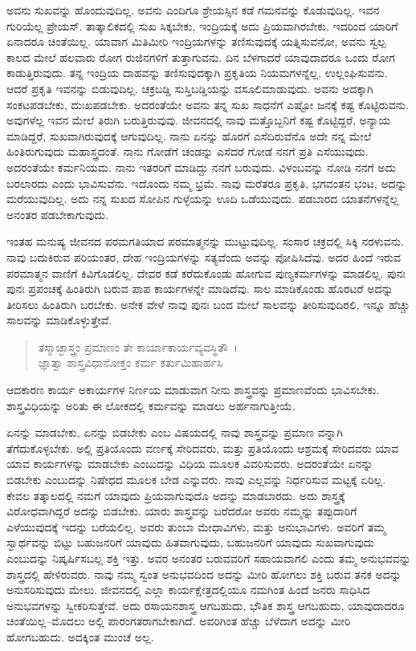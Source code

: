 ಅವನು ಸುಖವನ್ನು ಹೊಂದುವುದಿಲ್ಲ. ಅವನು ಎಂದಿಗೂ ಶ್ರೇಯಸ್ಸಿನ ಕಡೆ ಗಮನವನ್ನು ಕೊಡುವುದಿಲ್ಲ. ಇವನ ಗುರಿಯೆಲ್ಲ ಪ್ರೇಯಸ್. ತಾತ್ಕಾಲಿಕದಲ್ಲಿ ಸುಖ ಸಿಕ್ಕಬೇಕು, ಇಂದ್ರಿಯಕ್ಕೆ ಅದು ಪ್ರಿಯವಾಗಿರಬೇಕು. ಇದರಿಂದ ಯಾರಿಗೆ ಏನಾದರೂ ಚಿಂತೆಯಿಲ್ಲ. ಯಾವಾಗ ಮಿತಿಮೀರಿ ಇಂದ್ರಿಯಗಳನ್ನು ತಣಿಸುವುದಕ್ಕೆ ಯತ್ನಿಸುವನೋ, ಅವನು ಸ್ವಲ್ಪ ಕಾಲದ ಮೇಲೆ ಹಲವಾರು ರೋಗ ರುಜಿನಗಳಿಗೆ ತುತ್ತಾಗುವನು. ದಿನ ಬೆಳಗಾದರೆ ಯಾವುದಾದರೂ ಒಂದು ರೋಗ ಕಾಡುತ್ತಿರುವುದು. ತನ್ನ ಇಂದ್ರಿಯ ದಾಹವನ್ನು ತಣಿಸುವುದಕ್ಕಾಗಿ ಪ್ರಕೃತಿಯ ನಿಯಮಗಳನ್ನೆಲ್ಲ, ಉಲ್ಲಂಘಿಸುವನು. ಆದರೆ ಪ್ರಕೃತಿ ಇವನನ್ನು ಬಿಡುವುದಿಲ್ಲ. ಚಕ್ರಬಡ್ಡಿ ಸುಸ್ತಿಬಡ್ಡಿಯನ್ನು ವಸೂಲಿಮಾಡುವುದು. ಅವನು ಅದಕ್ಕಾಗಿ ಸಂಕಟಪಡಬೇಕು, ದುಃಖಪಡಬೇಕು. ಅದರಂತೆಯೇ ಅವನು ತನ್ನ ಸುಖ ಸಾಧನೆಗೆ ಎಷ್ಟೋ ಜನಕ್ಕೆ ಕಷ್ಟ ಕೊಟ್ಟಿರುವನು. ಅವುಗಳೆಲ್ಲ ಇವನ ಮೇಲೆ ತಿರುಗಿ ಬರುತ್ತಿರುವುವು. ಜೀವನದಲ್ಲಿ ನಾವು ಮತ್ತೊಬ್ಬನಿಗೆ ಕಷ್ಟ ಕೊಟ್ಟಿದ್ದರೆ, ಅನ್ಯಾಯ ಮಾಡಿದ್ದರೆ, ಸುಖವಾಗಿರುವುದಕ್ಕೆ ಆಗುವುದಿಲ್ಲ. ನಾನು ಏನನ್ನು ಹೊರಗೆ ಎಸೆದಿರುವೆನೊ ಅದೇ ನನ್ನ ಮೇಲೆ ಹಿಂತಿರುಗುವುದು ಮಹಾಸ್ತ್ರದಂತೆ. ನಾನು ಗೋಡೆಗೆ ಚಂಡನ್ನು ಎಸೆದರೆ ಗೋಡೆ ನನಗೆ ಪ್ರತಿ ಎಸೆಯುವುದು. ಅದರಂತೆಯೇ ಕರ್ಮನಿಯಮ. ನಾನು ಇತರರಿಗೆ ಮಾಡಿದ್ದು ನನಗೆ ಬರುವುದು. ವಿಳಂಬವನ್ನು ನೋಡಿ ನನಗೆ ಅದು ಬರಲಾರದು ಎಂದು ಭಾವಿಸುವೆನು. ಇದೊಂದು ನಮ್ಮ ಭ್ರಮೆ. ನಾವು ಮರೆತರೂ ಪ್ರಕೃತಿ, ಭಗವಂತನ ಭಂಟ, ಅದನ್ನು ಮರೆಯುವುದಿಲ್ಲ. ಅದು ನನ್ನ ಸುಖದ ಸೋಪಿನ ಗುಳ್ಳೆಯನ್ನು ಊದಿ ಒಡೆಯುವುದು. ಪಡಬಾರದ ಯಾತನೆಗಳನ್ನೆಲ್ಲ ಅನಂತರ ಪಡಬೇಕಾಗುವುದು.

ಇಂತಹ ಮನುಷ್ಯ ಜೀವನದ ಪರಮಗತಿಯಾದ ಪರಮಾತ್ಮನನ್ನು ಮುಟ್ಟುವುದಿಲ್ಲ. ಸಂಸಾರ ಚಕ್ರದಲ್ಲಿ ಸಿಕ್ಕಿ ನರಳುವನು. ನಾವು ಬದುಕಿರುವ ಪರಿಯಂತರ, ದೇಹ ಇಂದ್ರಿಯಗಳನ್ನು ಸತ್ಯವೆಂದು ಅವನ್ನು ಪೋಷಿಸಿದೆವು. ಅದರ ಹಿಂದೆ ಇರುವ ಪರಮಾತ್ಮನ ವಾಣಿಗೆ ಕಿವಿಗೊಡಲಿಲ್ಲ. ದೇವರ ಕಡೆ ಕರೆದುಕೊಂಡು ಹೋಗುವ ಪುಣ್ಯಕರ್ಮಗಳನ್ನು ಮಾಡಲಿಲ್ಲ. ಪುನಃ ಪುನಃ ಪ್ರಪಂಚಕ್ಕೆ ಹಿಂತಿರುಗಿ ಬರುವ ಪಾಪ ಕಾರ್ಯಗಳನ್ನೇ ಮಾಡಿದೆವು. ಸಾಲ ಮಾಡಿಕೊಂಡು ಹೊರಟರೆ ಅದನ್ನು ತೀರಿಸಲು ಹಿಂತಿರುಗಿ ಬರಬೇಕು. ಅನೇಕ ವೇಳೆ ನಾವು ಪುನಃ ಬಂದ ಮೇಲೆ ಸಾಲವನ್ನು ತೀರಿಸುವುದಿರಲಿ, ಇನ್ನೂ ಹೆಚ್ಚು ಸಾಲವನ್ನು ಮಾಡಿಕೊಳ್ಳುತ್ತೇವೆ.

\begin{verse}
ತಸ್ಮಾಚ್ಛಾಸ್ತ್ರಂ ಪ್ರಮಾಣಂ ತೇ ಕಾರ್ಯಾಕಾರ್ಯವ್ಯವಸ್ಥಿತೌ~।\\ಜ್ಞಾತ್ವಾ ಶಾಸ್ತ್ರವಿಧಾನೋಕ್ತಂ ಕರ್ಮ ಕರ್ತುಮಿಹಾರ್ಹಸಿ 
\end{verse}

{\small ಆದಕಾರಣ ಕಾರ್ಯ ಅಕಾರ್ಯಗಳ ನಿರ್ಣಯ ಮಾಡುವಾಗ ನೀನು ಶಾಸ್ತ್ರವನ್ನು ಪ್ರಮಾಣವೆಂದು ಭಾವಿಸಬೇಕು. ಶಾಸ್ತ್ರವಿಧಿಯನ್ನು ಅರಿತು ಈ ಲೋಕದಲ್ಲಿ ಕರ್ಮವನ್ನು ಮಾಡಲು ಅರ್ಹನಾಗುತ್ತೀಯೆ.}

ಏನನ್ನು ಮಾಡಬೇಕು, ಏನನ್ನು ಬಿಡಬೇಕು ಎಂಬ ವಿಷಯದಲ್ಲಿ ನಾವು ಶಾಸ್ತ್ರವನ್ನು ಪ್ರಮಾಣ ವನ್ನಾಗಿ ತೆಗೆದುಕೊಳ್ಳಬೇಕು. ಅಲ್ಲಿ ಪ್ರತಿಯೊಂದು ವರ್ಣಕ್ಕೆ ಸೇರಿದವರು, ಮತ್ತು ಪ್ರತಿಯೊಂದು ಆಶ್ರಮಕ್ಕೆ ಸೇರಿದವರು ಯಾವ ಯಾವ ಕಾರ್ಯಗಳನ್ನು ಮಾಡಬೇಕು ಎಂಬುದನ್ನು ವಿಧಿಯ ಮೂಲಕ ವಿವರಿಸುವರು. ಅದರಂತೆಯೇ ಏನನ್ನು ಬಿಡಬೇಕು ಎಂಬುದನ್ನು ನಿಷೇಧದ ಮೂಲಕ ಬೇಡ ಎನ್ನುವರು. ನಾವು ಎಲ್ಲವನ್ನು ನಿರ್ಧರಿಸುವ ಮಟ್ಟಕ್ಕೆ ಏರಿಲ್ಲ. ಕೇವಲ ತತ್ಕಾಲದಲ್ಲಿ ನಮಗೆ ಯಾವುದು ಪ್ರಿಯವಾಗುವುದೊ ಅದನ್ನು ಮಾಡಬಾರದು. ಅದು ಶಾಸ್ತ್ರಕ್ಕೆ ವಿರೋಧವಾಗಿದ್ದರೆ ಅದನ್ನು ಬಿಡಬೇಕು. ಯಾರು ಶಾಸ್ತ್ರವನ್ನು ಬರೆದರೋ ಅವರು ನಮ್ಮನ್ನು ತಪ್ಪುದಾರಿಗೆ ಎಳೆಯುವುದಕ್ಕೆ ಇದನ್ನು ಬರೆಯಲಿಲ್ಲ. ಅವರು ತುಂಬಾ ಮೇಧಾವಿಗಳು, ಮತ್ತು ಅನುಭಾವಿಗಳು. ಅವರಿಗೆ ತಮ್ಮ ಸ್ವಾರ್ಥವನ್ನು ಬಿಟ್ಟು ಬಹುಜನರಿಗೆ ಯಾವುದು ಹಿತವಾಗುವುದು, ಬಹುಜನರಿಗೆ ಯಾವುದು ಸುಖವಾಗುವುದು ಎಂಬುದನ್ನು ನಿಷ್ಕರ್ಷಿಸಬಲ್ಲ ಶಕ್ತಿ ಇತ್ತು. ಅವರ ಅನಂತರ ಬರುವವರಿಗೆ ಸಹಾಯವಾಗಲಿ ಎಂದು ತಮ್ಮ ಅನುಭವವನ್ನು ಶಾಸ್ತ್ರದಲ್ಲಿ ಹೇಳಿರುವರು. ನಾವು ನಮ್ಮ ಸ್ವಂತ ಅನುಭವದಿಂದ ಅದನ್ನು ಮೀರಿ ಹೋಗಲು ಶಕ್ತಿ ಬರುವ ತನಕ ಅದನ್ನು ಅನುಸರಿಸುವುದು ಮೇಲು. ಜೀವನದಲ್ಲಿ ಎಲ್ಲಾ ಕಾರ್ಯಕ್ಷೇತ್ರದಲ್ಲಿಯೂ ನಮಗಿಂತ ಹಿಂದೆ ಜನರು ಸಾಧಿಸಿದ ಅನುಭವಗಳನ್ನು ಸ್ವೀಕರಿಸುತ್ತೇವೆ. ಅದು ರಸಾಯನಶಾಸ್ತ್ರ ಆಗಬಹುದು, ಭೌತಿಕ ಶಾಸ್ತ್ರ ಆಗಬಹುದು, ಯಾವುದಾದರೂ ಚಿಂತೆಯಿಲ್ಲ–ಮೊದಲು ಅಲ್ಲಿ ಪಾರಂಗತರಾಗಬೇಕಾಗಿದೆ. ಅವರಿಗಿಂತ ಹೆಚ್ಚು ಬೆಳೆದಾಗ ಅದನ್ನು ಮೀರಿ ಹೋಗಬಹುದು. ಅದಕ್ಕಿಂತ ಮುಂಚೆ ಅಲ್ಲ.

